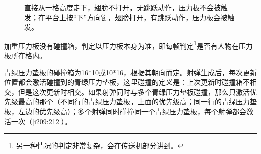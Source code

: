 \begin{figure}[!ht]
\begin{center}
\qquad
{}
\end{center}
\caption{\protect{}直接从一格高度走下，翅膀不打开，无跳跃动作，压力板不会被触发；\protect{}在平台上按“下”方向键，翅膀打开，有跳跃动作，压力板会被触发。}
\label{i201:202}
\end{figure}

加重压力板没有碰撞箱，判定以压力板本身为准，即每帧判定\footnote{另一种情况的判定非常复杂，会在\hyperref[sec9]{传送机部分}讲到。}是否有人物在压力板所在格内。

青绿压力垫板的碰撞箱为16*10或10*16，根据其朝向而定。射弹生成后，每次更新位置都会激活碰撞到的青绿压力垫板，这里碰撞的定义是：上次更新时碰撞箱不相交，但是这次更新时相交。如果射弹同时与多个青绿压力垫板碰撞，那么只激活优先级最高的那个（不同行的青绿压力垫板，上面的优先级高；同一行的青绿压力垫板，左边的优先级高）；多个射弹同时碰撞同一个青绿压力垫板，每个射弹都会激活一次（\autoref{i209:212}）。

